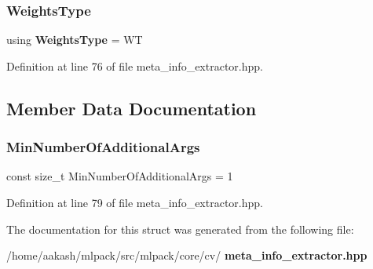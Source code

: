 \subsubsection{Weights\+Type}
{\footnotesize\ttfamily using \textbf{ Weights\+Type} =  WT}



Definition at line 76 of file meta\+\_\+info\+\_\+extractor.\+hpp.



\subsection{Member Data Documentation}
\mbox{\label{structmlpack_1_1cv_1_1TrainFormBase6_adacbdda6f41a542559105d6e48d1cfc2}} 
\subsubsection{Min\+Number\+Of\+Additional\+Args}
{\footnotesize\ttfamily const size\+\_\+t Min\+Number\+Of\+Additional\+Args = 1\hspace{0.3cm}{\ttfamily [static]}}



Definition at line 79 of file meta\+\_\+info\+\_\+extractor.\+hpp.



The documentation for this struct was generated from the following file\+:\begin{DoxyCompactItemize}
\item 
/home/aakash/mlpack/src/mlpack/core/cv/\textbf{ meta\+\_\+info\+\_\+extractor.\+hpp}\end{DoxyCompactItemize}
